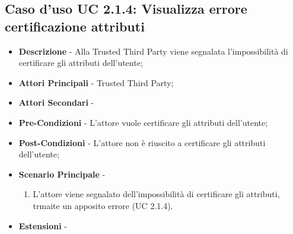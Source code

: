 \subsection{Caso d'uso UC 2.1.4: Visualizza errore certificazione attributi}
\begin{itemize}
	\item \textbf{Descrizione} - Alla Trusted Third Party viene segnalata l'impossibilità di certificare gli attributi dell'utente;
	\item \textbf{Attori Principali} - Trusted Third Party;
	\item \textbf{Attori Secondari} -
	\item \textbf{Pre-Condizioni} - L'attore vuole certificare gli attributi dell'utente;
	\item \textbf{Post-Condizioni} - L'attore non è riuscito a certificare gli attributi dell'utente;
	\item \textbf{Scenario Principale} - 
	\begin{enumerate}
		\item L'attore viene segnalato dell'impossibilità di certificare gli attributi, trmaite un apposito errore (UC 2.1.4).
	\end{enumerate}
	\item \textbf{Estensioni} -
\end{itemize}
